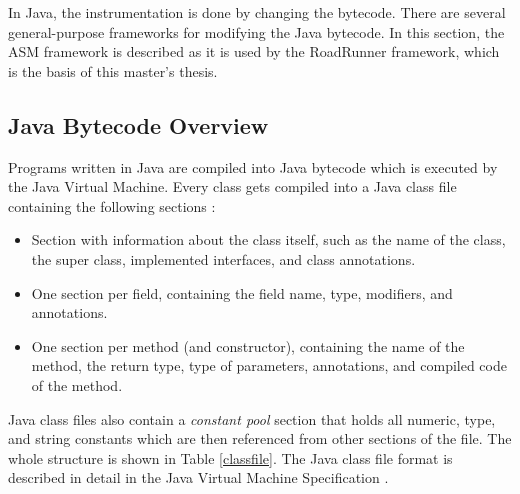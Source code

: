 In Java, the instrumentation is done by changing the bytecode. There are several
general-purpose frameworks for modifying the Java bytecode. In this section, the
ASM framework is described as it is used by the RoadRunner framework, which is
the basis of this master's thesis.

\subsection{Java Bytecode Overview}

Programs written in Java are compiled into Java bytecode which is executed by
the Java Virtual Machine. Every class gets compiled into a Java class file
containing the following sections \cite{asmguide}:
\begin{itemize}
    \item Section with information about the class itself, such as the name of
    the class, the super class, implemented interfaces, and class annotations.
    \item One section per field, containing the field name, type, modifiers, and
    annotations.
    \item One section per method (and constructor), containing the name of the
    method, the return type, type of parameters, annotations, and compiled code
    of the method.
\end{itemize}

Java class files also contain a \emph{constant pool} section that holds all
numeric, type, and string constants which are then referenced from other
sections of the file. The whole structure is shown in Table \ref{classfile}.
The Java class file format is described in detail in the Java Virtual Machine
Specification \cite{jvmspec}.

